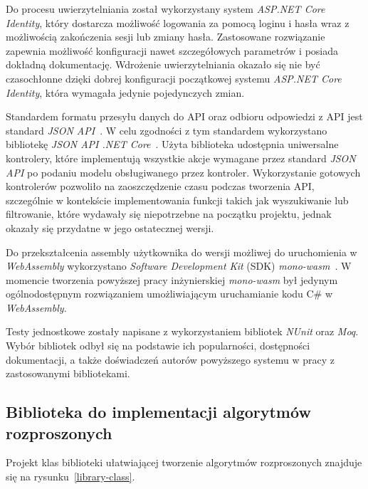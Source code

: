 \documentclass[a4paper,11pt,twoside]{report}
\theoremstyle{definition}
\begin{document}
Do procesu uwierzytelniania został wykorzystany system \textit{ASP.NET Core Identity}, który dostarcza możliwość logowania za pomocą loginu i hasła wraz z możliwością zakończenia sesji lub zmiany hasła. Zastosowane rozwiązanie zapewnia możliwość konfiguracji nawet szczegółowych parametrów i posiada dokładną dokumentację. 
Wdrożenie uwierzytelniania okazało się nie być czasochłonne dzięki dobrej konfiguracji początkowej systemu \textit{ASP.NET Core Identity}, która wymagała jedynie pojedynczych zmian.

Standardem formatu przesyłu danych do API oraz odbioru odpowiedzi z API jest standard \textit{JSON API}~\cite{jsonapi}. W celu zgodności z tym standardem wykorzystano bibliotekę \textit{JSON API .NET Core}~\cite{jsonapi-dotnet-core}. Użyta biblioteka udostępnia uniwersalne kontrolery, które implementują wszystkie akcje wymagane przez standard \textit{JSON API} po podaniu modelu obsługiwanego przez kontroler. Wykorzystanie gotowych kontrolerów pozwoliło na zaoszczędzenie czasu podczas tworzenia API, szczególnie w kontekście implementowania funkcji takich jak wyszukiwanie lub filtrowanie, które wydawały się niepotrzebne na początku projektu, jednak okazały się przydatne w jego ostatecznej wersji.

Do przekształcenia assembly użytkownika do wersji możliwej do uruchomienia w \textit{WebAssembly} wykorzystano \textit{Software Development Kit} (SDK) \textit{mono-wasm}~\cite{mono-wasm}. W momencie tworzenia powyższej pracy inżynierskiej \textit{mono-wasm} był jedynym ogólnodostępnym rozwiązaniem umożliwiającym uruchamianie kodu C\# w \textit{WebAssembly}.

Testy jednostkowe zostały napisane z wykorzystaniem bibliotek \textit{NUnit} oraz \textit{Moq}. Wybór bibliotek odbył się na podstawie ich popularności, dostępności dokumentacji, a także doświadczeń autorów powyższego systemu w pracy z zastosowanymi bibliotekami.

\subsection{Biblioteka do implementacji algorytmów rozproszonych}
\label{biblioteka-szczegoly}

Projekt klas biblioteki ułatwiającej tworzenie algorytmów rozproszonych znajduje się na rysunku~\ref{library-class}.
\end{document}

